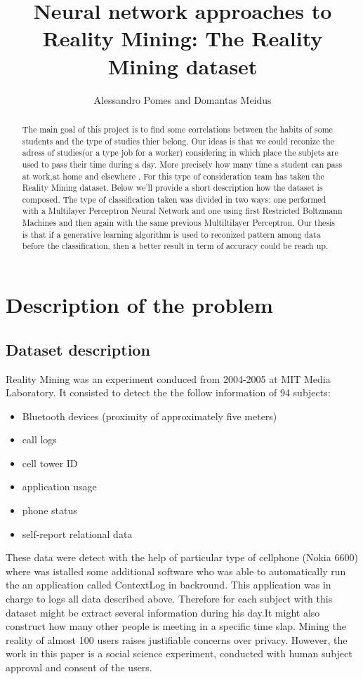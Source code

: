 \documentclass[paper=letter, fontsize=12pt]{article}
\title{Neural network approaches to Reality Mining: The
Reality Mining dataset}
\author{Alessandro Pomes and Domantas Meidus}
\begin{document}
\maketitle



\begin{abstract}
 The main goal of this project is to find some correlations between the habits of some students and the type of studies thier belong.
Our ideas is that we could reconize the adress of studies(or a type job for a worker) considering in which place the subjets are used to pass their time during a day. More precisely how many time a student can pass at work,at home and elsewhere .\newline 
For this type of consideration team has taken the Reality Mining dataset. Below we'll provide a short description how the dataset is composed. The type of classification taken was divided in two ways: one performed with a Multilayer Perceptron Neural Network and one using first Restricted Boltzmann Machines and then again with the same previous Multiltilayer Perceptron.
Our thesis is that if a generative learning algorithm is used to reconized  pattern among data before the classification, then a better result in term of accuracy could be reach up.
\end{abstract}
\tableofcontents
\section{Description of the problem}
 \subsection{Dataset description}
 Reality Mining was an experiment conduced from 2004-2005 at MIT Media Laboratory. It consisted to detect the the follow information of 94 subjects:
\begin{itemize}
\item Bluetooth devices (proximity of
approximately five meters)
\item call logs
  \item cell tower ID
 \item application usage
 \item phone status
 \item self-report relational data
 \end{itemize}
These data were detect with the help of particular type of cellphone (Nokia 6600) where was istalled some additional software who was able to automatically run the an application called ContextLog in backround.\newline
This application was in charge to logs all data described above.
Therefore for each subject with this dataset might be extract several information during his day.It might also construct how many other people is meeting in a specific time slap.
Mining the reality of almost 100 users raises justifiable concerns over privacy.
However, the work in this paper
is a social science experiment, conducted with human
subject approval and consent of the users.
\end{document}
